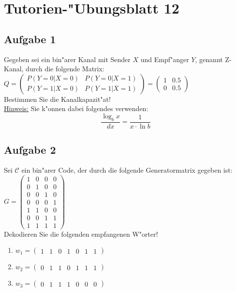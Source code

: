 \documentclass[10pt,oneside,onecolumn,a4paper,german,titlepage]{article}
\begin{document}
\section*{Tutorien-"Ubungsblatt 12}

\subsection*{Aufgabe 1}
Gegeben sei ein bin"arer Kanal mit Sender $X$ und Empf"anger $Y$, genannt Z-Kanal,
durch die folgende Matrix:\\[4pt]
$Q = \left( \begin{array}{cc}
P(Y=0|X=0) & P(Y=0|X=1) \\ P(Y=1|X=0) & P(Y=1|X=1)
\end{array} \right) = \left( \begin{array}{cc}
1 & 0.5 \\ 0 & 0.5
\end{array} \right)$\\[4pt]
Bestimmen Sie die Kanalkapazit"at!\\[4pt]
\underline{Hinweis:} Sie k"onnen dabei folgendes verwenden:
\[ \frac{\log_b{x}}{dx} = \frac{1}{x \cdot \ln{b}} \]

\subsection*{Aufgabe 2}
Sei $\mathcal{C}$ ein bin"arer Code, der durch die folgende Generatormatrix gegeben
ist:\\[4pt]
$G = \left( \begin{array}{cccc}
1 & 0 & 0 & 0 \\
0 & 1 & 0 & 0 \\
0 & 0 & 1 & 0 \\
0 & 0 & 0 & 1 \\
1 & 1 & 0 & 0 \\
0 & 0 & 1 & 1 \\
1 & 1 & 1 & 1
\end{array} \right)$\\[4pt]
Dekodieren Sie die folgenden empfangenen W"orter!
\begin{enumerate}
\item $w_1 = (\begin{array}{ccccccc}1 & 1 & 0 & 1 & 0 & 1 & 1\end{array})$
\item $w_2 = (\begin{array}{ccccccc}0 & 1 & 1 & 0 & 1 & 1 & 1\end{array})$
\item $w_3 = (\begin{array}{ccccccc}0 & 1 & 1 & 1 & 0 & 0 & 0\end{array})$
\end{enumerate}
\end{document}
